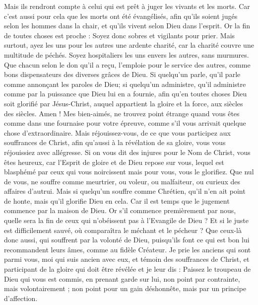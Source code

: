 \begin{multicols}{2}
Mais ils rendront compte à celui qui est prêt à juger les vivants et les morts.
Car c'est aussi pour cela que les morts ont été évangélisés, afin qu'ils soient jugés selon les hommes dans la chair, et qu'ils vivent selon Dieu dans l'esprit. 
Or la fin de toutes choses est proche : Soyez donc sobres et vigilants pour prier. 
Mais surtout, ayez les uns pour les autres une ardente charité, car la charité couvre une multitude de péchés.
Soyez hospitaliers les uns envers les autres, sans murmures. 
Que chacun selon le don qu'il a reçu, l'emploie pour le service des autres, comme bons dispensateurs des diverses grâces de Dieu. 
 Si quelqu'un parle, qu'il parle comme annonçant les paroles de Dieu; si quelqu'un administre, qu'il administre comme par la puissance que Dieu lui en a fournie, afin qu'en toutes choses Dieu soit glorifié par Jésus-Christ, auquel appartient la gloire et la force, aux siècles des siècles. Amen ! 
Mes bien-aimés, ne trouvez point étrange quand vous êtes comme dans une fournaise pour votre épreuve, comme s'il vous arrivait quelque chose d'extraordinaire. 
Mais réjouissez-vous, de ce que vous participez aux souffrances de Christ, afin qu'aussi à la révélation de sa gloire, vous vous réjouissiez avec allégresse.
Si on vous dit des injures pour le Nom de Christ, vous êtes heureux, car l'Esprit de gloire et de Dieu repose sur vous, lequel est blasphémé par ceux qui vous noircissent mais pour vous, vous le glorifiez.
Que nul de vous, ne souffre comme meurtrier, ou voleur, ou malfaiteur, ou curieux des affaires d'autrui. 
Mais si quelqu'un souffre comme Chrétien, qu'il n'en ait point de honte, mais qu'il glorifie Dieu en cela.
Car il est temps que le jugement commence par la maison de Dieu. Or s'il commence premièrement par nous, quelle sera la fin de ceux qui n'obéissent pas à l'Evangile de Dieu ?
Et si le juste est difficilement sauvé, où comparaîtra le méchant et le pécheur ? 
Que ceux-là donc aussi, qui souffrent par la volonté de Dieu, puisqu'ils font ce qui est bon lui recommandent leurs âmes, comme au fidèle Créateur. 
\VerseOne{}Je prie les anciens qui sont parmi vous, moi qui suis ancien avec eux, et témoin des souffrances de Christ, et participant de la gloire qui doit être révélée et je leur dis : 
Paissez le troupeau de Dieu qui vous est commis, en prenant garde sur lui, non point par contrainte, mais volontairement ; non point pour un gain déshonnête, mais par un principe d'affection. 

\end{multicols}
